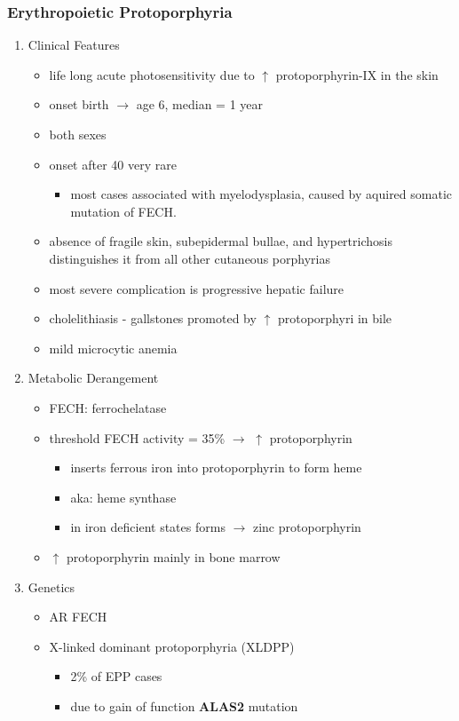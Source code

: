 \documentclass[12pt]{scrartcl}
\begin{document}
\subsubsection{Erythropoietic Protoporphyria}
\label{sec:org7ecc30a}
\begin{enumerate}
\item Clinical Features
\label{sec:orgb4e32db}
\begin{itemize}
\item life long acute photosensitivity due to \(\uparrow\) protoporphyrin-IX
in the skin
\item onset birth \(\to\) age 6, median = 1 year
\item both sexes
\item onset after 40 very rare
\begin{itemize}
\item most cases associated with myelodysplasia, caused by aquired
somatic mutation of FECH.
\end{itemize}
\item absence of fragile skin, subepidermal bullae, and hypertrichosis
distinguishes it from all other cutaneous porphyrias
\item most severe complication is progressive hepatic failure
\item cholelithiasis - gallstones promoted by \(\uparrow\) protoporphyri in bile
\item mild microcytic anemia
\end{itemize}

\item Metabolic Derangement
\label{sec:orge8ec749}
\begin{itemize}
\item FECH: ferrochelatase
\item threshold FECH activity = 35\% \(\to\) \(\uparrow\) protoporphyrin
\begin{itemize}
\item inserts ferrous iron into protoporphyrin to form heme
\item aka: heme synthase
\item in iron deficient states forms \(\to\) zinc protoporphyrin
\end{itemize}
\item \(\uparrow\) protoporphyrin mainly in bone marrow
\end{itemize}

\item Genetics
\label{sec:orgb61354a}
\begin{itemize}
\item AR FECH
\item X-linked dominant protoporphyria (XLDPP)
\begin{itemize}
\item 2\% of EPP cases
\item due to gain of function \textbf{ALAS2} mutation
\end{itemize}
\end{itemize}


\end{enumerate}
\end{document}
